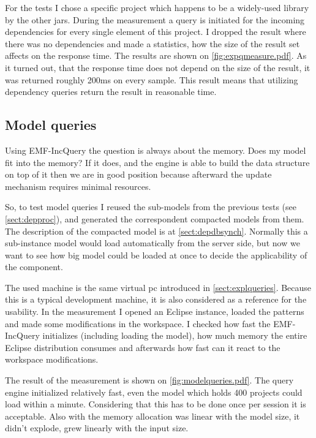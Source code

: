 For the tests I chose a specific project which happens to be a widely-used
library by the other jars. During the measurement a query is initiated for 
the incoming dependencies for every single element of this project. 
I dropped the result where there was no dependencies and made a statistics, how 
the size of the result set affects on the response time.
The results are shown on \autoref{fig:expqmeasure.pdf}.
As it turned out, that the response time does not depend on the size of the result,
it was returned roughly 200ms on every sample. This result means that utilizing 
dependency queries return the result in reasonable time. 


\subsection{Model queries}
Using EMF-IncQuery the question is always about the memory. Does my model fit into
the memory? If it does, and the engine is able to build the data structure on top
of it then we are in good position because afterward the update mechanism requires 
minimal resources. 

So, to test model queries I reused the sub-models from the previous tests (see
\autoref{sect:depproc}), and generated the correspondent compacted models from
them.
The description of the compacted model is at \autoref{sect:depdbsynch}. Normally
this a sub-instance model would load automatically from the server side, but now
we want to see how big model could be loaded at once to decide the applicability
of the component.

The used machine is the same virtual pc introduced in
\autoref{sect:explqueries}. Because this is a typical development machine, it is
also considered as a reference for the usability. In the measurement I opened an
Eclipse instance, loaded the patterns and made some modifications in the
workspace. I checked how fast the EMF-IncQuery initializes (including loading
the model), how much memory the entire Eclipse distribution consumes and
afterwards how fast can it react to the workspace modifications.

The result of the measurement is shown on \autoref{fig:modelqueries.pdf}.
The query engine initialized relatively fast, even the model which holds 400
projects could load within a minute. Considering that this has to be done once
per session it is acceptable. Also with the memory allocation was linear with 
the model size, it didn't explode, grew linearly with the input size. 


